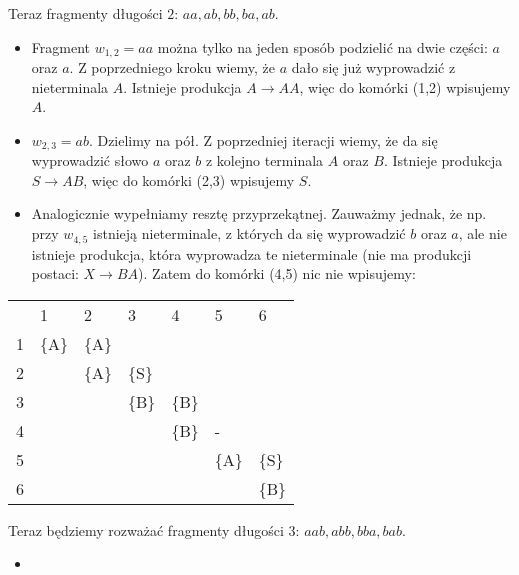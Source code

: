 Teraz fragmenty długości $2$: $aa, ab, bb, ba, ab$.
\begin{itemize}
\item Fragment $w_{1,2} = aa$ można tylko na jeden sposób podzielić na dwie części: $a$ oraz $a$. 
Z poprzedniego kroku wiemy, że $a$ dało się już wyprowadzić z nieterminala $A$.
Istnieje produkcja $A \rightarrow AA$, więc do komórki (1,2) wpisujemy $A$.
\item $w_{2,3} = ab$. Dzielimy na pół. Z poprzedniej iteracji wiemy, że da się wyprowadzić słowo $a$ oraz $b$ z kolejno terminala $A$ oraz $B$. Istnieje produkcja $S\rightarrow AB$, więc do komórki (2,3) wpisujemy $S$.
\item Analogicznie wypełniamy resztę przyprzekątnej. 
Zauważmy jednak, że np. przy $w_{4,5}$ istnieją nieterminale, z których da się wyprowadzić $b$ oraz $a$, ale nie istnieje produkcja, która wyprowadza te nieterminale (nie ma produkcji postaci: $ X \rightarrow BA$). 
Zatem do komórki (4,5) nic nie wpisujemy:
\end{itemize}

\begin{table}[h]
\centering
\label{my-label}
\begin{tabular}{lllllll}
                       & 1                          & 2                          & 3                          & 4                          & 5                          & 6                          \\ \cline{2-7} 
\multicolumn{1}{l|}{1} & \multicolumn{1}{l|}{\{A\}} & \multicolumn{1}{l|}{\{A\}} & \multicolumn{1}{l|}{}      & \multicolumn{1}{l|}{}      & \multicolumn{1}{l|}{}      & \multicolumn{1}{l|}{}      \\ \cline{2-7} 
\multicolumn{1}{l|}{2} & \multicolumn{1}{l|}{}      & \multicolumn{1}{l|}{\{A\}} & \multicolumn{1}{l|}{\{S\}} & \multicolumn{1}{l|}{}      & \multicolumn{1}{l|}{}      & \multicolumn{1}{l|}{}      \\ \cline{2-7} 
\multicolumn{1}{l|}{3} & \multicolumn{1}{l|}{}      & \multicolumn{1}{l|}{}      & \multicolumn{1}{l|}{\{B\}} & \multicolumn{1}{l|}{\{B\}} & \multicolumn{1}{l|}{}      & \multicolumn{1}{l|}{}      \\ \cline{2-7} 
\multicolumn{1}{l|}{4} & \multicolumn{1}{l|}{}      & \multicolumn{1}{l|}{}      & \multicolumn{1}{l|}{}      & \multicolumn{1}{l|}{\{B\}} & \multicolumn{1}{l|}{-}     & \multicolumn{1}{l|}{}      \\ \cline{2-7} 
\multicolumn{1}{l|}{5} & \multicolumn{1}{l|}{}      & \multicolumn{1}{l|}{}      & \multicolumn{1}{l|}{}      & \multicolumn{1}{l|}{}      & \multicolumn{1}{l|}{\{A\}} & \multicolumn{1}{l|}{\{S\}} \\ \cline{2-7} 
\multicolumn{1}{l|}{6} & \multicolumn{1}{l|}{}      & \multicolumn{1}{l|}{}      & \multicolumn{1}{l|}{}      & \multicolumn{1}{l|}{}      & \multicolumn{1}{l|}{}      & \multicolumn{1}{l|}{\{B\}} \\ \cline{2-7} 
\end{tabular}
\end{table}

Teraz będziemy rozważać fragmenty długości $3$: $aab, abb, bba, bab$. 
\begin{itemize}
\item 
\end{itemize}
